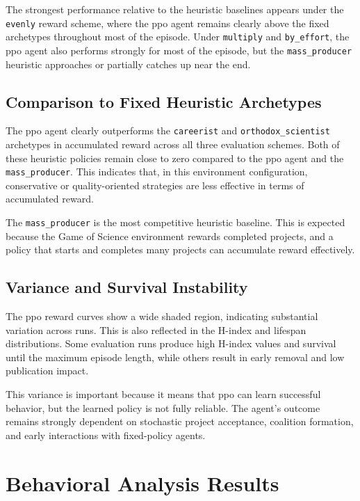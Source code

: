 \documentclass[english,bachelor]{hsluthesis}
\begin{document}
The strongest performance relative to the heuristic baselines appears under the \texttt{evenly} reward scheme, where the \gls{ppo} agent remains clearly above the fixed archetypes throughout most of the episode. Under \texttt{multiply} and \texttt{by\_effort}, the \gls{ppo} agent also performs strongly for most of the episode, but the \texttt{mass\_producer} heuristic approaches or partially catches up near the end.

\subsection{Comparison to Fixed Heuristic Archetypes}

The \gls{ppo} agent clearly outperforms the \texttt{careerist} and \texttt{orthodox\_scientist} archetypes in accumulated reward across all three evaluation schemes. Both of these heuristic policies remain close to zero compared to the \gls{ppo} agent and the \texttt{mass\_producer}. This indicates that, in this environment configuration, conservative or quality-oriented strategies are less effective in terms of accumulated reward.

The \texttt{mass\_producer} is the most competitive heuristic baseline. This is expected because the Game of Science environment rewards completed projects, and a policy that starts and completes many projects can accumulate reward effectively.

\subsection{Variance and Survival Instability}

The \gls{ppo} reward curves show a wide shaded region, indicating substantial variation across runs. This is also reflected in the H-index and lifespan distributions. Some evaluation runs produce high H-index values and survival until the maximum episode length, while others result in early removal and low publication impact.

This variance is important because it means that \gls{ppo} can learn successful behavior, but the learned policy is not fully reliable. The agent's outcome remains strongly dependent on stochastic project acceptance, coalition formation, and early interactions with fixed-policy agents.

\section{Behavioral Analysis Results}
\end{document}
